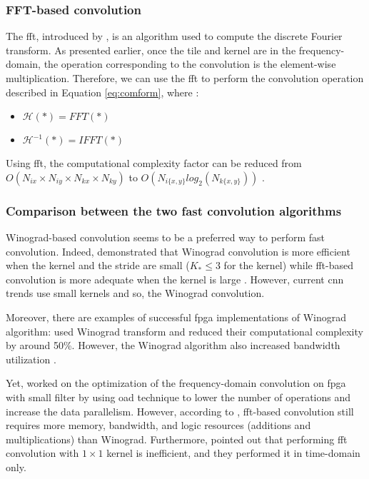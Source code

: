 \subsubsection{FFT-based convolution}
%
The \acrshort{fft}, introduced by \textcite{cooley_algorithm_1965}, is an algorithm used to compute the discrete Fourier transform. As presented earlier, once the tile and kernel are in the frequency-domain, the operation corresponding to the convolution is the element-wise multiplication. Therefore, we can use the \acrshort{fft} to perform the convolution operation described in Equation \eqref{eq:comform}, where \cite{liang_evaluating_2020}:
\begin{itemize}
    \item $\mathcal{H}(*) = FFT(*)$
    \item $\mathcal{H}^{-1}(*) = IFFT(*)$
\end{itemize}
%
Using \acrshort{fft}, the computational complexity factor can be reduced from $O(N_{ix} \times N_{iy} \times N_{kx} \times N_{ky})$ to $O(N_{i\{x,y\}} log_2(N_{k\{x,y\}}))$ \cite{w_smith_scientist_1997}.
%
\subsubsection{Comparison between the two fast convolution algorithms}
%
Winograd-based convolution seems to be a preferred way to perform fast convolution. Indeed, \textcite{lavin_fast_2016} demonstrated that Winograd convolution is more efficient when the kernel and the stride are small ($K_* \leq 3$ for the kernel) while \acrshort{fft}-based convolution is more adequate when the kernel is large \cite{ahmad_towards_2019, chitsaz_acceleration_2020}. However, current \acrshort{cnn} trends use small kernels \cite{sandler_mobilenetv2_2018, liang_evaluating_2020} and so, the Winograd convolution.

Moreover, there are examples of successful \acrshort{fpga} implementations of Winograd algorithm: \textcite{liang_evaluating_2020, aydonat_opencl_2017} used Winograd transform and reduced their computational complexity by around 50\%. However, the Winograd algorithm also increased bandwidth utilization \cite{xiao_exploring_2017}.

Yet, \textcite{liang_evaluating_2020, chitsaz_acceleration_2020, zeng_optimizing_2017} worked on the optimization of the frequency-domain convolution on \acrshort{fpga} with small filter by using \acrfull{oad} technique \cite{w_smith_scientist_1997} to lower the number of operations and increase the data parallelism. However, according to \textcite{liang_evaluating_2020, podili_fast_2017}, \acrshort{fft}-based convolution still requires more memory, bandwidth, and logic resources (additions and multiplications) than Winograd. Furthermore, \textcite{zhang_caffeine_2016} pointed out that performing \acrshort{fft} convolution with $1 \times 1$ kernel is inefficient, and they performed it in time-domain only.
